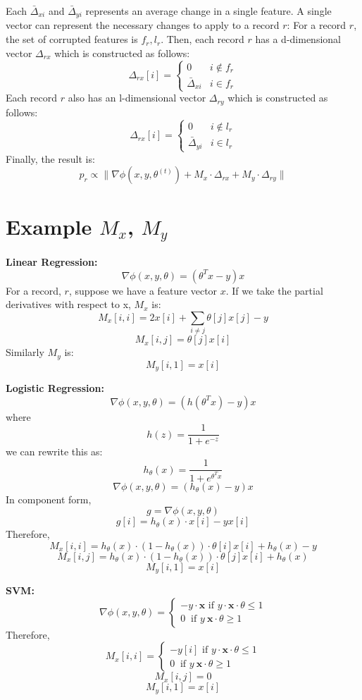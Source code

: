 Each $\bar{\Delta}_{xi}$ and $\bar{\Delta}_{yi}$ represents an average change in a single feature.
A single vector can represent the necessary changes to apply to a record $r$:
For a record $r$, the set of corrupted features is $f_r,l_r$.
Then, each record $r$ has a d-dimensional vector $\Delta_{rx}$ which is constructed as follows:
\[
 \Delta_{rx}[i] = \begin{cases} 0 & i \notin f_r \\ 
\bar{\Delta}_{xi} & i \in f_r
\end{cases} 
\]
Each record $r$ also has an l-dimensional vector $\Delta_{ry}$ which is constructed as follows:
\[
 \Delta_{rx}[i] = \begin{cases} 0 & i \notin l_r \\ 
\bar{\Delta}_{yi} & i \in l_r
\end{cases} 
\]
Finally, the result is: 
\[p_{r}\propto\|\nabla\phi(x,y,\theta^{(t)}) + M_x \cdot \Delta_{rx} +  M_y \cdot \Delta_{ry}\|
\]

\section{Example $M_x$, $M_y$}\label{example-deriv}
\noindent\textbf{Linear Regression: }
\[
\nabla\phi(x,y,\theta) = (\theta^Tx - y)x
\]
For a record, $r$, suppose we have a feature vector $x$.
If we take the partial derivatives with respect to x, $M_x$ is:
\[
M_x[i,i] = 2x[i] + \sum_{i \ne j} \theta[j]x[j] - y 
\]
\[
M_x[i,j] = \theta[j]x[i]
\]
Similarly $M_y$ is:
\[
M_y[i,1] = x[i] 
\]

\vspace{0.5em}

\noindent\textbf{Logistic Regression: } 
\[
\nabla\phi(x,y,\theta) = (h(\theta^Tx) - y)x
\]
where
\[
h(z) = \frac{1}{1+e^{-z}}
\]
we can rewrite this as:
\[
h_{\theta}(x) = \frac{1}{1+e^{\theta^Tx}}
\]
\[
\nabla\phi(x,y,\theta) = (h_{\theta}(x) - y)x
\]
In component form,
\[
g = \nabla\phi(x,y,\theta)
\]
\[
g[i] = h_{\theta}(x)\cdot x[i] - yx[i]
\]
Therefore,
\[
M_x[i,i] = h_{\theta}(x)\cdot(1- h_{\theta}(x))\cdot \theta[i] x[i] + h_{\theta}(x) - y
\]
\[
M_x[i,j] = h_{\theta}(x)\cdot(1- h_{\theta}(x))\cdot \theta[j] x[i] + h_{\theta}(x)
\]
\[
M_y[i,1] = x[i] 
\]

\noindent\textbf{SVM: } 
\[
\nabla\phi(x,y,\theta) =
\begin{cases}      
-y\cdot\boldsymbol{x} \text{ if } y\cdot\boldsymbol{x}\cdot\theta \le 1 \\
0\ \text{ if } y\ \boldsymbol{x}\cdot\theta \geq 1      
\end{cases}
\]
Therefore,
\[
M_x[i,i] = \begin{cases}      
-y[i] \text{ if } y\cdot\boldsymbol{x}\cdot\theta \le 1 \\
0\ \text{ if } y\ \boldsymbol{x}\cdot\theta \geq 1      
\end{cases} 
\]
\[
M_x[i,j] = 0
\]
\[
M_y[i,1] = x[i] 
\]

